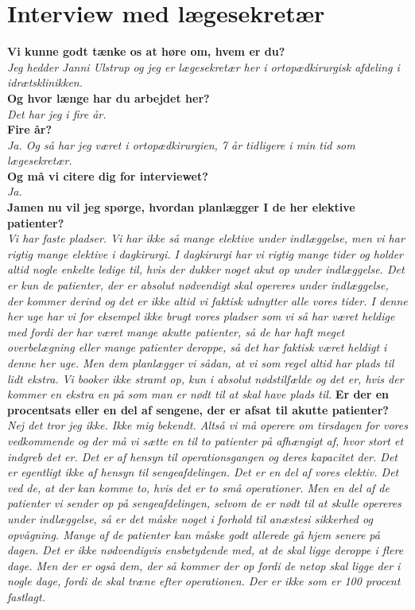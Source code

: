 \section{Interview med lægesekretær} \label{bilagsek}
\textbf{Vi kunne godt tænke os at høre om, hvem er du?}\\
\noindent
\textit{Jeg hedder Janni Ulstrup og jeg er lægesekretær her i ortopædkirurgisk afdeling i idrætsklinikken.} \\
\noindent
\textbf{Og hvor længe har du arbejdet her?} \\
\noindent
\textit{Det har jeg i fire år.} \\
\noindent
\textbf{Fire år?} \\
\noindent
\textit{Ja. Og så har jeg været i ortopædkirurgien, 7 år tidligere i min tid som lægesekretær.} \\
\noindent
\textbf{Og må vi citere dig for interviewet?}\\
\noindent
\textit{Ja.} \\
\noindent
\textbf{Jamen nu vil jeg spørge, hvordan planlægger I de her elektive patienter?}\\
\noindent
\textit{Vi har faste pladser. Vi har ikke så mange elektive under indlæggelse, men vi har rigtig mange elektive i dagkirurgi. I dagkirurgi har vi rigtig mange tider og  holder altid nogle enkelte ledige til, hvis der dukker noget akut op under indlæggelse. Det er kun de patienter, der er absolut nødvendigt skal opereres under indlæggelse, der kommer derind og det er ikke altid vi faktisk udnytter alle vores tider. I denne her uge har vi for eksempel ikke brugt vores pladser som vi så har været heldige med fordi der har været mange akutte patienter, så de har haft meget overbelægning eller mange patienter deroppe, så det har faktisk været heldigt i denne her uge. Men dem planlægger vi sådan, at vi som regel altid har plads til lidt ekstra. Vi booker ikke stramt op, kun i absolut nødstilfælde og det er, hvis der kommer en ekstra en på som man er nødt til at skal have plads til.}
\textbf{Er der en procentsats eller en del af sengene, der er afsat til akutte patienter?}\\
\noindent
\textit{Nej det tror jeg ikke. Ikke mig bekendt. Altså vi må operere om tirsdagen for vores vedkommende og der må vi sætte en til to patienter på afhængigt af, hvor stort et indgreb det er. Det er af hensyn til operationsgangen og deres kapacitet der. Det er egentligt ikke af hensyn til sengeafdelingen. Det er en del af vores elektiv. Det ved de, at der kan komme to, hvis det er to små operationer. Men en del af de patienter vi sender op på sengeafdelingen, selvom de er nødt til at skulle opereres under indlæggelse, så er det måske noget i forhold til anæstesi sikkerhed og opvågning. Mange af de patienter kan måske godt allerede gå hjem senere på dagen. Det er ikke nødvendigvis ensbetydende med, at de skal ligge deroppe i flere dage. Men der er også dem, der så kommer der op fordi de netop skal ligge der i nogle dage, fordi de skal træne efter operationen. Der er ikke som er 100 procent fastlagt.} 
